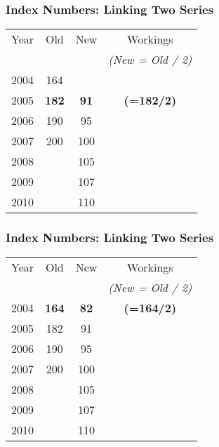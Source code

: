 \documentclass{beamer}
\begin{document}
\begin{frame}
\frametitle{Index Numbers: Linking Two Series}
\Large
\begin{center}
\begin{tabular}
{|c||c|c||c|}
\hline
Year	&\phantom{sp}	Old	\phantom{sp}&\phantom{sp}	New\phantom{sp}	&	Workings	\\ 
	&&	&	\textit{(New = Old / 2)}	\\ 
\hline \hline

2004	&	164	&		&		\\ \hline

2005	&	\textbf{182}	&	\textbf{91}	&	\textbf{(=182/2)}	\\ \hline
2006	&	190	&	95	&		\\ \hline
2007	&	200	&	100	&		\\ \hline
2008	&		&	105	&		\\ \hline
2009	&		&	107	&		\\ \hline
2010	&		&	110	&		\\ \hline
\end{tabular}  
\end{center}
\end{frame}

\begin{frame}
\frametitle{Index Numbers: Linking Two Series}
\Large
\begin{center}
\begin{tabular}
{|c||c|c||c|}
\hline
Year	&\phantom{sp}	Old	\phantom{sp}&\phantom{sp}	New\phantom{sp}	&	Workings	\\ 
	&&	&	\textit{(New = Old / 2)}	\\ 
\hline \hline



2004	&	\textbf{164}	&	\textbf{82}	&	\textbf{(=164/2)}	\\ \hline
2005	&	182	&	91	&		\\ \hline
2006	&	190	&	95	&		\\ \hline
2007	&	200	&	100	&		\\ \hline
2008	&		&	105	&		\\ \hline
2009	&		&	107	&		\\ \hline
2010	&		&	110	&		\\ \hline
\end{tabular}  
\end{center}
\end{frame}
\end{document}
